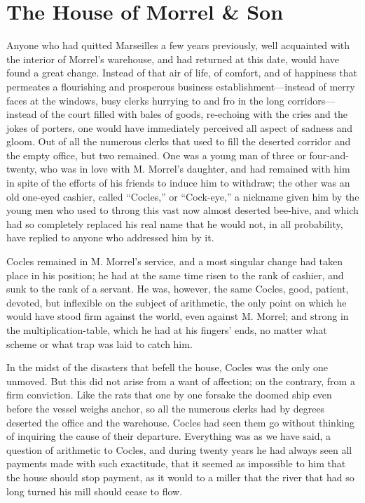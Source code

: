 \chapter{The House of Morrel \& Son}

Anyone who had quitted Marseilles a few years previously, well
acquainted with the interior of Morrel’s warehouse, and had returned at
this date, would have found a great change. Instead of that air of
life, of comfort, and of happiness that permeates a flourishing and
prosperous business establishment—instead of merry faces at the
windows, busy clerks hurrying to and fro in the long corridors—instead
of the court filled with bales of goods, re-echoing with the cries and
the jokes of porters, one would have immediately perceived all aspect
of sadness and gloom. Out of all the numerous clerks that used to fill
the deserted corridor and the empty office, but two remained. One was a
young man of three or four-and-twenty, who was in love with M. Morrel’s
daughter, and had remained with him in spite of the efforts of his
friends to induce him to withdraw; the other was an old one-eyed
cashier, called “Cocles,” or “Cock-eye,” a nickname given him by the
young men who used to throng this vast now almost deserted bee-hive,
and which had so completely replaced his real name that he would not,
in all probability, have replied to anyone who addressed him by it.

Cocles remained in M. Morrel’s service, and a most singular change had
taken place in his position; he had at the same time risen to the rank
of cashier, and sunk to the rank of a servant. He was, however, the
same Cocles, good, patient, devoted, but inflexible on the subject of
arithmetic, the only point on which he would have stood firm against
the world, even against M. Morrel; and strong in the
multiplication-table, which he had at his fingers’ ends, no matter what
scheme or what trap was laid to catch him.

In the midst of the disasters that befell the house, Cocles was the
only one unmoved. But this did not arise from a want of affection; on
the contrary, from a firm conviction. Like the rats that one by one
forsake the doomed ship even before the vessel weighs anchor, so all
the numerous clerks had by degrees deserted the office and the
warehouse. Cocles had seen them go without thinking of inquiring the
cause of their departure. Everything was as we have said, a question of
arithmetic to Cocles, and during twenty years he had always seen all
payments made with such exactitude, that it seemed as impossible to him
that the house should stop payment, as it would to a miller that the
river that had so long turned his mill should cease to flow.

